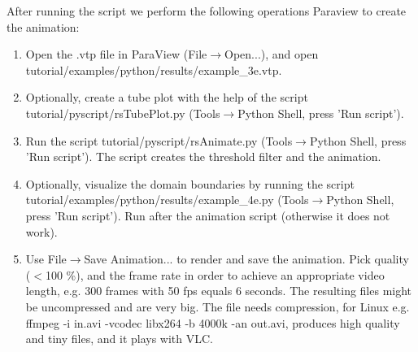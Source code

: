 After running the script we perform the following operations Paraview to create the animation:
\begin{enumerate}
 \item Open the .vtp file in ParaView (File$\rightarrow$Open...), and open tutorial/examples/python/results/example\_3e.vtp.
 \item Optionally, create a tube plot with the help of the script tutorial/pyscript/rsTubePlot.py (Tools$\rightarrow$Python Shell, press 'Run script').
 \item Run the script tutorial/pyscript/rsAnimate.py (Tools$\rightarrow$Python Shell, press 'Run script'). The script creates the threshold filter and the animation. 
 \item Optionally, visualize the domain boundaries by running the script tutorial/examples/python/results/example\_4e.py (Tools$\rightarrow$Python Shell, press 'Run script'). Run after the animation script (otherwise it does not work).  
 \item Use File$\rightarrow$Save Animation... to render and save the animation. Pick quality ($<$100 \%), and the frame rate in order to achieve an appropriate video length, e.g. 300 frames with 50 fps equals 6 seconds. The resulting files might be uncompressed and are very big. The file needs compression, for Linux e.g. ffmpeg -i in.avi -vcodec libx264 -b 4000k -an out.avi, produces high quality and tiny files, and it plays with VLC.
\end{enumerate}




